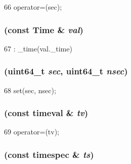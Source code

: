 \begin{DoxyCode}
66 { operator=(sec); }
\end{DoxyCode}
\hypertarget{classTime_a4e61f2d79527b5f0d77f0ca3badfc395}{
\subsubsection[{Time}]{ (const {\bf Time} \& {\em val})}}
\label{classTime_a4e61f2d79527b5f0d77f0ca3badfc395}



\begin{DoxyCode}
67 : _time(val._time) { }
\end{DoxyCode}
\hypertarget{classTime_ae77dae7d6e62d188ba83f0e7db63cdd5}{
\subsubsection[{Time}]{ (uint64\_\-t {\em sec}, \/  uint64\_\-t {\em nsec})}}
\label{classTime_ae77dae7d6e62d188ba83f0e7db63cdd5}



\begin{DoxyCode}
68 { set(sec, nsec); }
\end{DoxyCode}
\hypertarget{classTime_a781d0313688090b013c5879e43179fa7}{
\subsubsection[{Time}]{ (const timeval \& {\em tv})}}
\label{classTime_a781d0313688090b013c5879e43179fa7}



\begin{DoxyCode}
69 { operator=(tv); }
\end{DoxyCode}
\hypertarget{classTime_a4f4f47ffb0388a0f536dbf23db1ae4d5}{
\subsubsection[{Time}]{ (const timespec \& {\em ts})}}
\label{classTime_a4f4f47ffb0388a0f536dbf23db1ae4d5}




